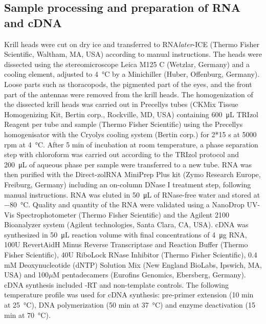 \subsection{Sample processing and preparation of RNA and cDNA}

Krill heads were cut on dry ice and transferred to
RNA\textit{later}\texttrademark-ICE (Thermo Fisher Scientific, Waltham, MA,
USA) according to manual instructions. The heads were dissected using the
stereomicroscope Leica M125 C (Wetzlar, Germany) and a cooling element,
adjusted to \SI{4}{\celsius} by a Minichiller (Huber, Offenburg, Germany).
Loose parts such as thoracopods, the pigmented part of the eyes, and the front
part of the antennas were removed from the krill heads. The homogenization of
the dissected krill heads was carried out in
Precellys\textsuperscript{\textregistered} tubes (CKMix Tissue Homogenizing
Kit, Bertin corp., Rockville, MD, USA) containing \SI{600}{\micro\liter} TRIzol\texttrademark
Reagent per tube and sample (Thermo Fisher Scientific) using the
Precellys\textsuperscript{\textregistered} homogenisator with the
Cryolys\textsuperscript{\textregistered} cooling system (Bertin corp.) for 2*15
s at 5000 rpm at \SI{4}{\celsius}. After 5 min of incubation at room temperature, a phase
separation step with chloroform was carried out according to the TRIzol
protocol and \SI{200}{\micro\liter} of aqueous phase per sample were transferred to a new tube.
RNA was then purified with the Direct-zol\texttrademark RNA MiniPrep Plus kit
(Zymo Research Europe, Freiburg, Germany) including an on-column DNase I
treatment step, following manual instructions. RNA was eluted in \SI{50}{\micro\liter} of
RNase-free water and stored at \SI{-80}{\celsius}.  Quality and quantity of the RNA were
validated using a NanoDrop UV-Vis Spectrophotometer (Thermo Fisher
Scientific) and the Agilent 2100 Bioanalyzer system (Agilent technologies,
Santa Clara, CA, USA).  cDNA was synthesized in \SI{50}{\micro\liter} reaction volume with
final concentrations of \SI{4}{\micro\gram} RNA, 100U RevertAid\texttrademark H Minus Reverse
Transcriptase and Reaction Buffer (Thermo Fisher Scientific), 40U RiboLock
RNase Inhibitor (Thermo Fisher Scientific), 0.4 mM Deoxynucleotide (dNTP)
Solution Mix (New England BioLabs, Ipswich, MA, USA) and 100$\mu$M pentadecamers
(Eurofins Genomics, Ebersberg, Germany). cDNA synthesis included -RT and
non-template controls. The following temperature profile was used for cDNA
synthesis: pre-primer extension (10 min at \SI{25}{\celsius}), DNA
polymerization (50 min at \SI{37}{\celsius}) and enzyme deactivation (15 min at
\SI{70}{\celsius}).


